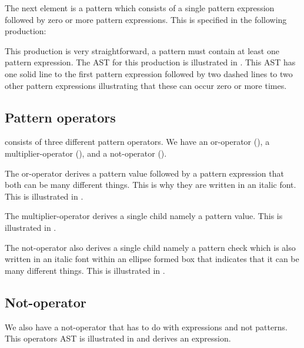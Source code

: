 The next element is a pattern which consists of a single pattern expression followed by zero or more pattern expressions. This is specified in the following production:%

\begin{ebnf}%
%
\end{ebnf}%

This production is very straightforward, a pattern must contain at least one pattern expression. The AST for this production is illustrated in . This AST has one solid line to the first pattern expression followed by two dashed lines to two other pattern expressions illustrating that these can occur zero or more times.%

%

\subsection{Pattern operators}%

\productname{} consists of three different pattern operators. We have an or-operator (), a multiplier-operator (), and a not-operator ().%

The or-operator derives a pattern value followed by a pattern expression that both can be many different things. This is why they are written in an italic font. This is illustrated in .%

%

The multiplier-operator derives a single child namely a pattern value. This is illustrated in .%

%

The not-operator also derives a single child namely a pattern check which is also written in an italic font within an ellipse formed box that indicates that it can be many different things. This is illustrated in .%

%

\subsection{Not-operator}%

We also have a not-operator that has to do with expressions and not patterns. This operators AST is illustrated in  and derives an expression.%


